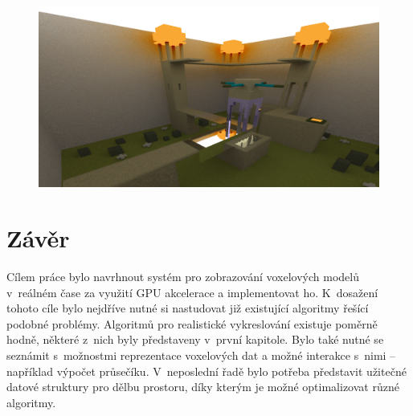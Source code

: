 \begin{figure}[H]
	\centering
	\captionsetup{justification=centering}
	\includegraphics[scale=0.9]{images/indirect_render_2.png}
	\label{fig:indirect_render_2}
\end{figure}


\chapter{Závěr}\label{zaver}
Cílem práce bylo navrhnout systém pro zobrazování voxelových modelů v~reálném čase za využití GPU akcelerace a implementovat ho. K~dosažení tohoto cíle bylo nejdříve nutné si nastudovat již existující algoritmy řešící podobné problémy. Algoritmů pro realistické vykreslování existuje poměrně hodně, některé z~nich byly představeny v~první kapitole. Bylo také nutné se seznámit s~možnostmi reprezentace voxelových dat a možné interakce s~nimi -- například výpočet průsečíku. V~neposlední řadě bylo potřeba představit užitečné datové struktury pro dělbu prostoru, díky kterým je možné optimalizovat různé algoritmy.

